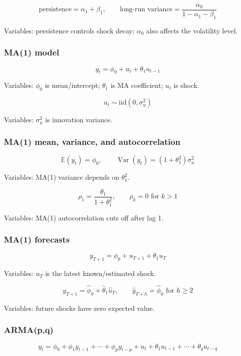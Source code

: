 \documentclass[
  8pt,
  twocolumn]{extarticle}
\begin{document}
\[
\text{persistence}=\alpha_1+\beta_1,\qquad \text{long-run variance}=\frac{\alpha_0}{1-\alpha_1-\beta_1}
\]

Variables: persistence controls shock decay; \(\alpha_0\) also affects
the volatility level.

\subsubsection{MA(1) model}\label{ma1-model}

\[
y_t=\phi_0+u_t+\theta_1u_{t-1}
\]

Variables: \(\phi_0\) is mean/intercept; \(\theta_1\) is MA coefficient;
\(u_t\) is shock.

\[
u_t\sim\mathrm{iid}(0,\sigma_u^2)
\]

Variables: \(\sigma_u^2\) is innovation variance.

\subsubsection{MA(1) mean, variance, and
autocorrelation}\label{ma1-mean-variance-and-autocorrelation}

\[
\mathbb E(y_t)=\phi_0,\qquad \operatorname{Var}(y_t)=(1+\theta_1^2)\sigma_u^2
\]

Variables: MA(1) variance depends on \(\theta_1^2\).

\[
\rho_1=\frac{\theta_1}{1+\theta_1^2},\qquad \rho_k=0\text{ for }k>1
\]

Variables: MA(1) autocorrelation cuts off after lag 1.

\subsubsection{MA(1) forecasts}\label{ma1-forecasts}

\[
y_{T+1}=\phi_0+u_{T+1}+\theta_1u_T
\]

Variables: \(u_T\) is the latest known/estimated shock.

\[
\hat y_{T+1}=\hat\phi_0+\hat\theta_1\hat u_T,\qquad \hat y_{T+h}=\hat\phi_0\text{ for }h\ge2
\]

Variables: future shocks have zero expected value.

\subsubsection{ARMA(p,q)}\label{armapq}

\[
y_t=\phi_0+\phi_1y_{t-1}+\cdots+\phi_py_{t-p}+u_t+\theta_1u_{t-1}+\cdots+\theta_qu_{t-q}
\]
\end{document}
